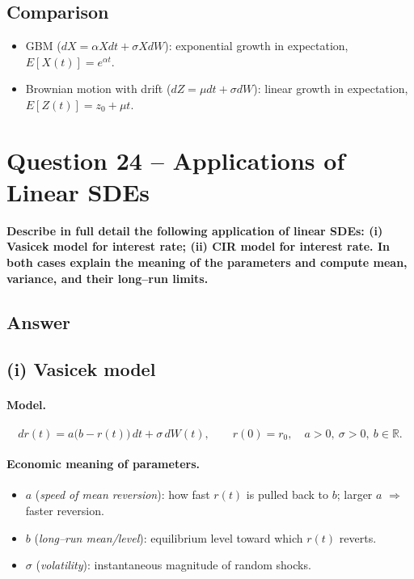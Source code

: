 \documentclass[12pt,a4paper]{book}
\theoremstyle{remark}
\begin{document}
\subsection*{Comparison}
\begin{itemize}
    \item GBM ($dX=\alpha X dt + \sigma X dW$): exponential growth in expectation, $E[X(t)] = e^{\alpha t}$.
    \item Brownian motion with drift ($dZ=\mu dt + \sigma dW$): linear growth in expectation, $E[Z(t)] = z_0 + \mu t$.
\end{itemize}













\newpage
\section{Question 24 -- Applications of Linear SDEs}
\textbf{Describe in full detail the following application of linear SDEs:
(i) Vasicek model for interest rate; (ii) CIR model for interest rate.
In both cases explain the meaning of the parameters and compute mean, variance, and their long–run limits.}

\subsection*{Answer}

\subsection*{(i) Vasicek model}
\paragraph{Model.}
\[
dr(t)=a\bigl(b-r(t)\bigr)\,dt+\sigma\,dW(t),\qquad r(0)=r_0,\quad a>0,\ \sigma>0,\ b\in\mathbb{R}.
\]

\paragraph{Economic meaning of parameters.}
\begin{itemize}
  \item $a$ (\emph{speed of mean reversion}): how fast $r(t)$ is pulled back to $b$; larger $a$ $\Rightarrow$ faster reversion.
  \item $b$ (\emph{long–run mean/level}): equilibrium level toward which $r(t)$ reverts.
  \item $\sigma$ (\emph{volatility}): instantaneous magnitude of random shocks.
\end{itemize}
\end{document}
